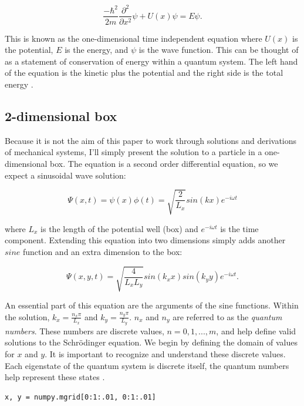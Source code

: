\documentclass[11pt]{article}
\begin{document}
\begin{equation}
\frac{-\hbar^2}{2m}\frac{\partial^2}{\partial x^2}\psi + U(x)\psi = E\psi.
\end{equation}

This is known as the one-dimensional time independent equation where $U(x)$ is the potential, $E$ is the energy, and $\psi$ is the wave function. This can be thought of as a statement of conservation of energy within a quantum system. The left hand of the equation is the kinetic plus the potential and the right side is the total energy \cite{modernphysics}. 

\subsection{2-dimensional box}

Because it is not the aim of this paper to work through solutions and derivations of mechanical systems, I'll simply present the solution to a particle in a one-dimensional box. The equation is a second order differential equation, so we expect a sinusoidal wave solution: 

\begin{equation}
\Psi(x, t) = \psi(x)\phi(t) = \sqrt{\frac{2}{L_x}}sin(kx)e^{-i\omega t}
\end{equation}

\noindent where $L_x$ is the length of the potential well (box) and $e^{-i\omega t}$ is the time component. Extending this equation into two dimensions simply adds another $sine$ function and an extra dimension to the box:

\begin{equation}
\Psi(x, y, t) = \sqrt{\frac{4}{L_x L_y}}sin(k_x x)sin(k_y y)e^{-i\omega t}.
\end{equation}

An essential part of this equation are the arguments of the sine functions. Within the solution, $k_x = \frac{n_x\pi}{L_x}$ and $k_y = \frac{n_y\pi}{L_y}$. $n_x$ and $n_y$ are referred to as the \textit{quantum numbers}. These numbers are discrete values, $n = 0, 1, ..., m$, and help define valid solutions to the Schrödinger equation. We begin by defining the domain of values for $x$ and $y$. It is important to recognize and understand these discrete values. Each eigenstate of the quantum system is discrete itself, the quantum numbers help represent these states \cite{modernphysics}.   

\begin{verbatim}
x, y = numpy.mgrid[0:1:.01, 0:1:.01]
\end{verbatim}
\end{document}
